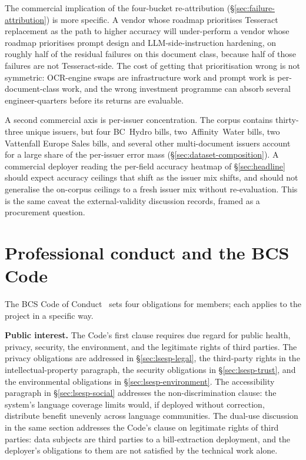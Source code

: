 The commercial implication of the four-bucket re-attribution
(\S\ref{sec:failure-attribution}) is more specific. A vendor whose roadmap
prioritises Tesseract replacement as the path to higher accuracy will
under-perform a vendor whose roadmap prioritises prompt design and
LLM-side-instruction hardening, on roughly half of the residual failures on
this document class, because half of those failures are not Tesseract-side.
The cost of getting that prioritisation wrong is not symmetric: OCR-engine
swaps are infrastructure work and prompt work is per-document-class work, and
the wrong investment programme can absorb several engineer-quarters before its
returns are evaluable.

A second commercial axis is per-issuer concentration. The corpus contains
thirty-three unique issuers, but four BC~Hydro bills, two~Affinity~Water bills,
two Vattenfall Europe Sales bills, and several other multi-document issuers
account for a large share of the per-issuer error mass
(\S\ref{sec:dataset-composition}). A commercial deployer reading the per-field
accuracy heatmap of \S\ref{sec:headline} should expect accuracy ceilings that
shift as the issuer mix shifts, and should not generalise the on-corpus
ceilings to a fresh issuer mix without re-evaluation. This is the same caveat
the external-validity discussion records, framed as a procurement question.

\section{Professional conduct and the BCS Code}
\label{sec:lsesp-bcs}

The BCS Code of Conduct~\cite{bcs2022} sets four obligations for members; each
applies to the project in a specific way.

\textbf{Public interest.} The Code's first clause requires due regard for
public health, privacy, security, the environment, and the legitimate rights of
third parties. The privacy obligations are addressed in \S\ref{sec:lsesp-legal},
the third-party rights in the intellectual-property paragraph, the security
obligations in \S\ref{sec:lsesp-trust}, and the environmental obligations in
\S\ref{sec:lsesp-environment}. The accessibility paragraph in
\S\ref{sec:lsesp-social} addresses the non-discrimination clause: the system's
language coverage limits would, if deployed without correction, distribute
benefit unevenly across language communities. The dual-use discussion in the
same section addresses the Code's clause on legitimate rights of third parties:
data subjects are third parties to a bill-extraction deployment, and the
deployer's obligations to them are not satisfied by the technical work alone.

